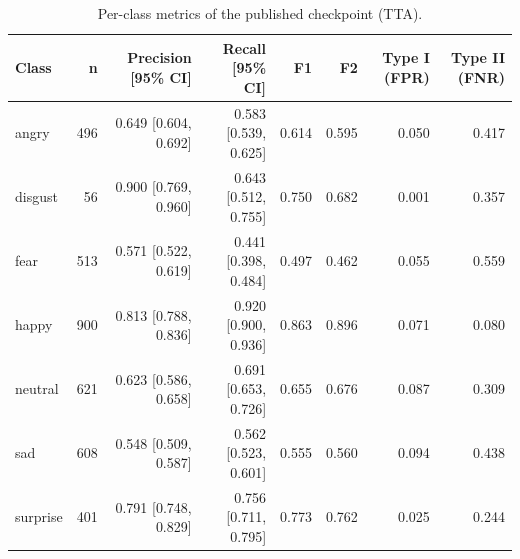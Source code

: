 \begin{table}[ht]
\centering
\small
\caption{Per-class metrics of the published checkpoint (TTA).}
\label{tab:perclass-original}
\begin{tabular}{lrrrrrrr}
\toprule
Class & n & Precision [95\% CI] & Recall [95\% CI] & F1 & F2 & Type I (FPR) & Type II (FNR) \\
\midrule
angry & 496 & 0.649 [0.604, 0.692] & 0.583 [0.539, 0.625] & 0.614 & 0.595 & 0.050 & 0.417 \\
disgust & 56 & 0.900 [0.769, 0.960] & 0.643 [0.512, 0.755] & 0.750 & 0.682 & 0.001 & 0.357 \\
fear & 513 & 0.571 [0.522, 0.619] & 0.441 [0.398, 0.484] & 0.497 & 0.462 & 0.055 & 0.559 \\
happy & 900 & 0.813 [0.788, 0.836] & 0.920 [0.900, 0.936] & 0.863 & 0.896 & 0.071 & 0.080 \\
neutral & 621 & 0.623 [0.586, 0.658] & 0.691 [0.653, 0.726] & 0.655 & 0.676 & 0.087 & 0.309 \\
sad & 608 & 0.548 [0.509, 0.587] & 0.562 [0.523, 0.601] & 0.555 & 0.560 & 0.094 & 0.438 \\
surprise & 401 & 0.791 [0.748, 0.829] & 0.756 [0.711, 0.795] & 0.773 & 0.762 & 0.025 & 0.244 \\
\bottomrule
\end{tabular}
\end{table}